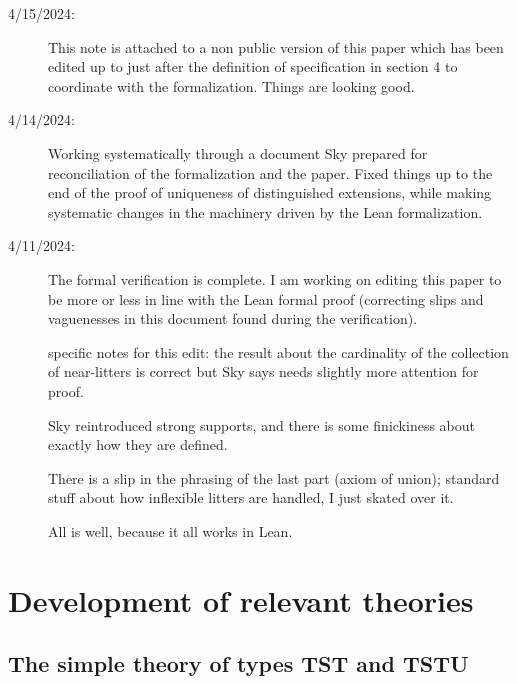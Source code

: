 \documentclass[112pt]{article}
\begin{document}
\begin{description}
\item[4/15/2024:]  This note is attached to a non public version of this paper which has been edited up to just after the definition of specification in section 4 to coordinate with the formalization.  Things are looking good.

\item[4/14/2024:]  Working systematically through a document Sky prepared for reconciliation of the formalization and the paper.  Fixed things up to the end of the proof of uniqueness of distinguished extensions, while making systematic changes in the machinery driven by the Lean formalization.

\item[4/11/2024:]  The formal verification is complete.  I am working on editing this paper to be more or less in line with the Lean formal proof (correcting slips and vaguenesses in this document found during the verification).

specific notes for this edit:  the result about the cardinality of the collection of near-litters is correct but Sky says needs slightly more attention for proof.  

Sky reintroduced strong supports, and there is some finickiness about exactly how they are defined.

There is a slip in the phrasing of the last part (axiom of union);  standard stuff about how inflexible litters are handled, I just skated over it.

All is well, because it all works in Lean.













\end{description}


\newpage

\section{Development of relevant theories}



\subsection{The simple theory of types TST and TSTU}
\end{document}
